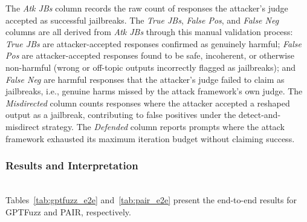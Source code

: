 \documentclass[conference,compsoc]{IEEEtran}
\begin{document}
The \textit{Atk JBs} column records the raw count of responses the attacker's judge accepted as successful jailbreaks. The \textit{True JBs}, \textit{False Pos}, and \textit{False Neg} columns are all derived from \textit{Atk JBs} through this manual validation process: \textit{True JBs} are attacker-accepted responses confirmed as genuinely harmful; \textit{False Pos} are attacker-accepted responses found to be safe, incoherent, or otherwise non-harmful (wrong or off-topic outputs incorrectly flagged as jailbreaks); and \textit{False Neg} are harmful responses that the attacker's judge failed to claim as jailbreaks, i.e., genuine harms missed by the attack framework's own judge. The \textit{Misdirected} column counts responses where the attacker accepted a reshaped output as a jailbreak, contributing to false positives under the detect-and-misdirect strategy. The \textit{Defended} column reports prompts where the attack framework exhausted its maximum iteration budget without claiming success.

\subsubsection{Results and Interpretation}

\mbox{}\\[8pt]
Tables~\ref{tab:gptfuzz_e2e} and~\ref{tab:pair_e2e} present the end-to-end results for GPTFuzz and PAIR, respectively.

\begin{table}[t]
    \centering
    \setlength{\tabcolsep}{6pt}
    \renewcommand{\arraystretch}{1.2}
    \caption{GPTFuzz end-to-end results (50 prompts, max 50 iterations, rigorously validated ASR).}
    \label{tab:gptfuzz_e2e}
\end{table}
\end{document}
